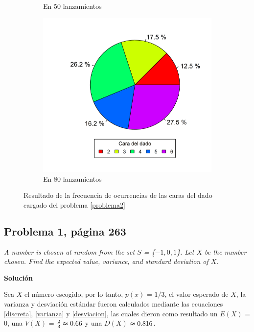\documentclass{article}
\begin{document}
\begin{figure}[h]
\begin{center}
\begin{subfigure}{0.32\textwidth}
        \caption{En $50$ lanzamientos}
    \end{subfigure}
    \begin{subfigure}{0.32\textwidth}
        \includegraphics[width=.99\linewidth]{Figures/dados80-.png}
        \caption{En $80$ lanzamientos}
    \end{subfigure}
    \caption{Resultado de la frecuencia de ocurrencias de las caras del dado cargado del problema \ref{problema2}}
    \label{dados1}
    \end{center}
\end{figure}

\subsection{Problema 1, página 263} \label{problema4}
\textit{A number is chosen at random from the set $S$ = \{$-1, 0, 1$\}. Let $X$ be the number chosen. Find the expected value, variance, and standard deviation of $X$.}

\noindent \textbf{Solución}

\noindent Sea $X$ el número escogido, por lo tanto, $p(x)$ = $1/3$, el valor esperado de $X$, la varianza y desviación estándar fueron calculados mediante las ecuaciones \ref{discreta}, \ref{varianza} y \ref{desviacion}, las cuales dieron como resultado un $E{(X)}$ = $0$, una $V{(X)}$ = $\frac{2}{3} \thickapprox 0.66$ y una $D{(X)}$ $\thickapprox 0.816$.
\end{document}
